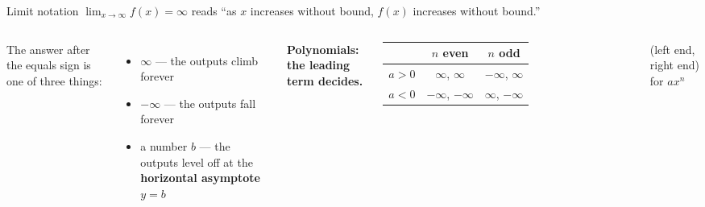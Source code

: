 \documentclass[aspectratio=169, 11pt]{beamer}
\begin{document}
\begin{frame}[t, plain]

  \begin{block}{Limit notation}
    \(\displaystyle\lim_{x \to \infty} f(x) = \infty\) \quad reads \quad ``as \(x\) increases
    without bound, \(f(x)\) increases without bound.''
  \end{block}

  \medskip
  \begin{columns}[T]
      The answer after the equals sign is one of three things:
      \begin{itemize}\setlength{\itemsep}{4pt}
        \item \(\infty\) --- the outputs climb forever
        \item \(-\infty\) --- the outputs fall forever
        \item a number \(b\) --- the outputs level off at the \textbf{horizontal asymptote}
              \(y = b\)
      \end{itemize}

      \textbf{Polynomials: the leading term decides.}

      \smallskip
      \renewcommand{\arraystretch}{1.3}
      \begin{tabular}{|l|c|c|}
        \hline
        & \(n\) even & \(n\) odd \\ \hline
        \(a > 0\) & \(\infty\), \(\infty\) & \(-\infty\), \(\infty\) \\ \hline
        \(a < 0\) & \(-\infty\), \(-\infty\) & \(\infty\), \(-\infty\) \\ \hline
      \end{tabular}

      \smallskip
      {\small (left end, right end) for \(ax^n\)}
  \end{columns}
\end{frame}
\end{document}
